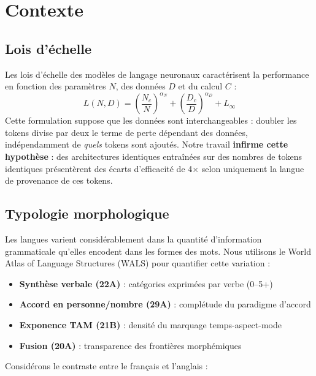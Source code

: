 \documentclass[11pt]{article}
\begin{document}
\section{Contexte}

\subsection{Lois d'échelle}

Les lois d'échelle des modèles de langage neuronaux \citep{kaplan2020scaling, hoffmann2022training} caractérisent la performance en fonction des paramètres $N$, des données $D$ et du calcul $C$ :
\[
L(N, D) = \left(\frac{N_c}{N}\right)^{\alpha_N} + \left(\frac{D_c}{D}\right)^{\alpha_D} + L_\infty
\]
Cette formulation suppose que les données sont interchangeables : doubler les tokens divise par deux le terme de perte dépendant des données, indépendamment de \textit{quels} tokens sont ajoutés. Notre travail \textbf{infirme cette hypothèse} : des architectures identiques entraînées sur des nombres de tokens identiques présentèrent des écarts d'efficacité de 4× selon uniquement la langue de provenance de ces tokens.

\subsection{Typologie morphologique}

Les langues varient considérablement dans la quantité d'information grammaticale qu'elles encodent dans les formes des mots. Nous utilisons le World Atlas of Language Structures (WALS) \citep{dryer2013wals} pour quantifier cette variation :

\begin{itemize}
    \item \textbf{Synthèse verbale (22A)} : catégories exprimées par verbe (0--5+)
    \item \textbf{Accord en personne/nombre (29A)} : complétude du paradigme d'accord
    \item \textbf{Exponence TAM (21B)} : densité du marquage temps-aspect-mode
    \item \textbf{Fusion (20A)} : transparence des frontières morphémiques
\end{itemize}

Considérons le contraste entre le français et l'anglais :
\end{document}
